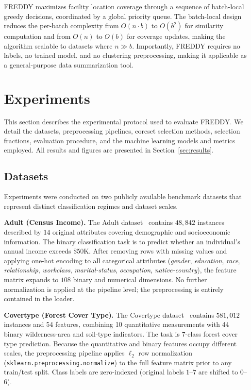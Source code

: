 \documentclass{article}
\begin{document}
FREDDY maximizes facility location coverage through a sequence of batch-local
greedy decisions, coordinated by a global priority queue.
The batch-local design reduces the per-batch complexity from $O(n \cdot b)$ to
$O(b^2)$ for similarity computation and from $O(n)$ to $O(b)$ for coverage updates,
making the algorithm scalable to datasets where $n \gg b$.
Importantly, FREDDY requires no labels, no trained model, and no clustering
preprocessing, making it applicable as a general-purpose data summarization tool.


\section{Experiments}\label{sec:experiments}

This section describes the experimental protocol used to evaluate FREDDY.
We detail the datasets, preprocessing pipelines, coreset selection methods,
selection fractions, evaluation procedure, and the machine learning models
and metrics employed.
All results and figures are presented in Section~\ref{sec:results}.

\subsection{Datasets}

Experiments were conducted on two publicly available benchmark datasets that
represent distinct classification regimes and dataset scales.

\textbf{Adult (Census Income).}
The Adult dataset~\cite{misc_adult_2} contains $48{,}842$ instances described
by 14 original attributes covering demographic and socioeconomic information.
The binary classification task is to predict whether an individual's annual
income exceeds \$50K.
After removing rows with missing values and applying one-hot encoding to all
categorical attributes
(\textit{gender}, \textit{education}, \textit{race}, \textit{relationship},
\textit{workclass}, \textit{marital-status}, \textit{occupation},
\textit{native-country}),
the feature matrix expands to $108$ binary and numerical dimensions.
No further normalization is applied at the pipeline level; the preprocessing
is entirely contained in the loader.

\textbf{Covertype (Forest Cover Type).}
The Covertype dataset~\cite{misc_covertype_31} contains $581{,}012$ instances
and 54 features, combining 10 quantitative measurements with 44 binary
wilderness-area and soil-type indicators.
The task is 7-class forest cover type prediction.
Because the quantitative and binary features occupy different scales,
the preprocessing pipeline applies $\ell_2$ row normalization
(\texttt{sklearn.preprocessing.normalize}) to the full feature matrix
prior to any train/test split.
Class labels are zero-indexed (original labels $1$--$7$ are shifted to $0$--$6$).
\end{document}
